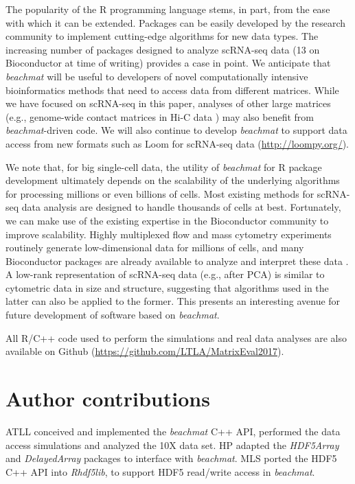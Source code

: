 \documentclass[10pt,letterpaper]{article}
\newcommand{\beachmat}{\textit{beachmat}}
\begin{document}
The popularity of the R programming language stems, in part, from the ease with which it can be extended.
Packages can be easily developed by the research community to implement cutting-edge algorithms for new data types.
The increasing number of packages designed to analyze scRNA-seq data (13 on Bioconductor at time of writing) provides a case in point.
We anticipate that \beachmat{} will be useful to developers of novel computationally intensive bioinformatics methods that need to access data from different matrices.
While we have focused on scRNA-seq in this paper, analyses of other large matrices (e.g., genome-wide contact matrices in Hi-C data \cite{lun2016infrastructure}) may also benefit from \beachmat{}-driven code.
We will also continue to develop \beachmat{} to support data access from new formats such as Loom for scRNA-seq data (\url{http://loompy.org/}).

We note that, for big single-cell data, the utility of \beachmat{} for R package development ultimately depends on the scalability of the underlying algorithms for processing millions or even billions of cells.
Most existing methods for scRNA-seq data analysis are designed to handle thousands of cells at best.
Fortunately, we can make use of the existing expertise in the Bioconductor community to improve scalability.
Highly multiplexed flow and mass cytometry experiments routinely generate low-dimensional data for millions of cells,
and many Bioconductor packages are already available to analyze and interpret these data \cite{finak2014opencyto,weber2016comparison,lun2017testing}.
A low-rank representation of scRNA-seq data (e.g., after PCA) is similar to cytometric data in size and structure, suggesting that algorithms used in the latter can also be applied to the former.
This presents an interesting avenue for future development of software based on \beachmat{}.

All R/C++ code used to perform the simulations and real data analyses are also available on Github (\url{https://github.com/LTLA/MatrixEval2017}).

\section*{Author contributions}
ATLL conceived and implemented the \beachmat{} C++ API, performed the data access simulations and analyzed the 10X data set.
HP adapted the \textit{HDF5Array} and \textit{DelayedArray} packages to interface with \beachmat{}.
MLS ported the HDF5 C++ API into \textit{Rhdf5lib}, to support HDF5 read/write access in \beachmat{}.
\end{document}

